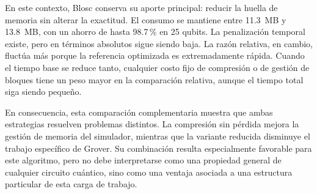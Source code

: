 En este contexto, Blosc conserva su aporte principal: reducir la huella de
memoria sin alterar la exactitud. El consumo se mantiene entre 11.3~MB y
13.8~MB, con un ahorro de hasta 98.7\,\% en 25 qubits. La penalización temporal
existe, pero en términos absolutos sigue siendo baja. La razón relativa, en
cambio, fluctúa más porque la referencia optimizada es extremadamente rápida.
Cuando el tiempo base se reduce tanto, cualquier costo fijo de compresión o de
gestión de bloques tiene un peso mayor en la comparación relativa, aunque el
tiempo total siga siendo pequeño.

En consecuencia, esta comparación complementaria muestra que ambas estrategias
resuelven problemas distintos. La compresión sin pérdida mejora la gestión de
memoria del simulador, mientras que la variante reducida disminuye el trabajo
específico de Grover. Su combinación resulta especialmente favorable para este
algoritmo, pero no debe interpretarse como una propiedad general de cualquier
circuito cuántico, sino como una ventaja asociada a una estructura particular de
esta carga de trabajo.
